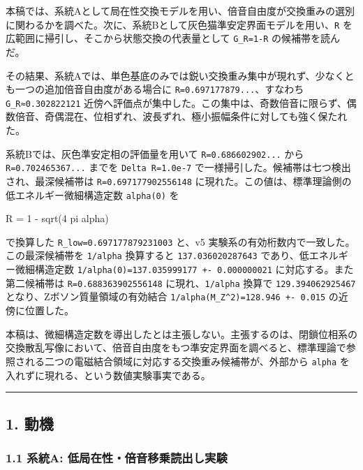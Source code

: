 \documentclass[
]{article}
\newenvironment{Shaded}{}{}
\newcommand{\NormalTok}[1]{#1}
\begin{document}
本稿では、系統Aとして局在性交換モデルを用い、倍音自由度が交換重みの選別に関わるかを調べた。次に、系統Bとして灰色猫準安定界面モデルを用い、\texttt{R}
を広範囲に掃引し、そこから状態交換の代表量として \texttt{G\_R=1-R}
の候補帯を読んだ。

その結果、系統Aでは、単色基底のみでは鋭い交換重み集中が現れず、少なくとも一つの追加倍音自由度がある場合に
\texttt{R=0.697177879...}、すなわち \texttt{G\_R≈0.302822121}
近傍へ評価点が集中した。この集中は、奇数倍音に限らず、偶数倍音、奇偶混在、位相ずれ、波長ずれ、極小振幅条件に対しても強く保たれた。

系統Bでは、灰色準安定相の評価量を用いて \texttt{R=0.686602902...} から
\texttt{R=0.702465367...} までを \texttt{Delta\ R=1.0e-7}
で一様掃引した。候補帯は七つ検出され、最深候補帯は
\texttt{R=0.697177902556148}
に現れた。この値は、標準理論側の低エネルギー微細構造定数
\texttt{alpha(0)} を

\begin{Shaded}
\begin{Highlighting}[]
\NormalTok{R = 1 {-} sqrt(4 pi alpha)}
\end{Highlighting}
\end{Shaded}

で換算した \texttt{R\_low=0.697177879231003} と、v5
実験系の有効桁数内で一致した。この最深候補帯を \texttt{1/alpha}
換算すると \texttt{137.036020287643} であり、低エネルギー微細構造定数
\texttt{1/alpha(0)=137.035999177\ +-\ 0.000000021}
に対応する。また第二候補帯は \texttt{R=0.688363902556148}
に現れ、\texttt{1/alpha} 換算で \texttt{129.394062925467}
となり、Zボソン質量領域の有効結合
\texttt{1/alpha(M\_Z\^{}2)=128.946\ +-\ 0.015} の近傍に位置した。

本稿は、微細構造定数を導出したとは主張しない。主張するのは、閉鎖位相系の交換散乱写像において、倍音自由度をもつ準安定界面を調べると、標準理論で参照される二つの電磁結合領域に対応する交換重み候補帯が、外部から
\texttt{alpha} を入れずに現れる、という数値実験事実である。

\begin{center}\rule{0.5\linewidth}{0.5pt}\end{center}

\subsection{1. 動機}\label{ux52d5ux6a5f}

\subsubsection{1.1 系統A:
低局在性・倍音移乗読出し実験}\label{ux7cfbux7d71a-ux4f4eux5c40ux5728ux6027ux500dux97f3ux79fbux4e57ux8aadux51faux3057ux5b9fux9a13}
\end{document}
